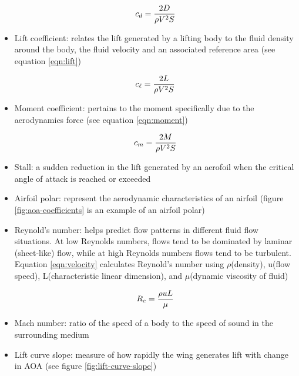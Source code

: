 \documentclass{journal}
\begin{document}
\begin{itemize}
		\begin{equation}
			\centering
			\label{eqn:drag}
			c_d = \frac{2D}{\rho{V^2}S}
		\end{equation}
		
		\item Lift coefficient: relates the lift generated by a lifting body to the fluid density around the body, the fluid velocity and an associated reference area (see equation \ref{eqn:lift})
		
		\begin{equation}
			\centering
			\label{eqn:lift}
			c_\ell = \frac{2L}{\rho{V^2}S}
		\end{equation}
		
		\item Moment coefficient: pertains to the moment specifically due to the aerodynamics force (see equation \ref{eqn:moment})
		
		\begin{equation}
			\centering
			\label{eqn:moment}
			c_m = \frac{2M}{\rho{V^2}S}
		\end{equation}
		
		\item Stall: a sudden reduction in the lift generated by an aerofoil when the critical angle of attack is reached or exceeded	
		\item Airfoil polar: represent the aerodynamic characteristics of an airfoil (figure \ref{fig:aoa-coefficients} is an example of an airfoil polar)
		\item Reynold's number: helps predict flow patterns in different fluid flow situations. At low Reynolds numbers, flows tend to be dominated by laminar (sheet-like) flow, while at high Reynolds numbers flows tend to be turbulent. Equation \ref{eqn:velocity} calculates Reynold's number using \(\rho\)(density), u(flow speed), L(characteristic linear dimension), and \(\mu\)(dynamic viscosity of fluid)
		
		\begin{equation}
			\centering
			\label{eqn:velocity}
			R_e = \frac{\rho{uL}}{\mu}
		\end{equation}
		
		\item Mach number: ratio of the speed of a body to the speed of sound in the surrounding medium
		\item Lift curve slope: measure of how rapidly the wing generates lift with change in AOA (see figure \ref{fig:lift-curve-slope})
		

\end{itemize}
\end{document}
